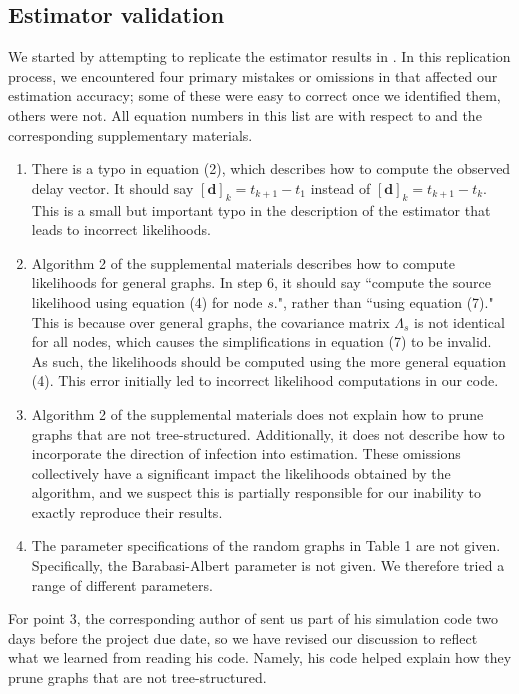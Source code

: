 \subsection{Estimator validation}
We started by attempting to replicate the estimator results in \cite{pinto}. 
In this replication process, we encountered four primary mistakes or omissions in \cite{pinto} that affected our estimation accuracy; some of these were easy to correct once we identified them, others were not. All equation numbers in this list are with respect to \cite{pinto} and the corresponding supplementary materials.
\begin{enumerate}
\item There is a typo in equation (2), which describes how to compute the observed delay vector. It should say $[\boldsymbol d]_k=t_{k+1}-t_1$ instead of $[\boldsymbol d]_k=t_{k+1}-t_k$. This is a small but important typo in the description of the estimator that leads to incorrect likelihoods. 
\item Algorithm 2 of the supplemental materials describes how to compute likelihoods for general graphs. In step 6, it should say ``compute the source likelihood using equation (4) for node $s$.", rather than ``using equation (7)." This is because over general graphs, the covariance matrix $\Lambda_s$ is not identical for all nodes, which causes the simplifications in equation (7) to be invalid. As such, the likelihoods should be computed using the more general equation (4). This error initially led to incorrect likelihood computations in our code.
\item Algorithm 2 of the supplemental materials does not explain how to prune graphs that are not tree-structured. Additionally, it does not describe how to incorporate the direction of infection into estimation. These omissions collectively have a significant impact the likelihoods obtained by the algorithm, and we suspect this is partially responsible for our inability to exactly reproduce their results.
\item The parameter specifications of the random graphs in Table 1 are not given. Specifically, the Barabasi-Albert parameter is not given. We therefore tried a range of different parameters.
\end{enumerate}
For point 3, the corresponding author of \cite{pinto} sent us part of his simulation code two days before the project due date, so we have revised our discussion to reflect what we learned from reading his code. Namely, his code helped explain how they prune graphs that are not tree-structured. 

